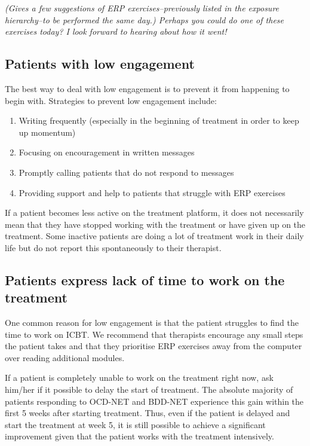 \documentclass[]{book}
\providecommand{\tightlist}{%
  \setlength{\itemsep}{0pt}\setlength{\parskip}{0pt}}
\theoremstyle{definition}
\theoremstyle{definition}
\theoremstyle{definition}
\theoremstyle{remark}
\begin{document}
\emph{(Gives a few suggestions of ERP exercises--previously listed in
the exposure hierarchy--to be performed the same day.) Perhaps you could
do one of these exercises today? I look forward to hearing about how it
went!}

\hypertarget{patients-with-low-engagement}{%
\subsection{Patients with low
engagement}\label{patients-with-low-engagement}}

The best way to deal with low engagement is to prevent it from happening
to begin with. Strategies to prevent low engagement include:

\begin{enumerate}
\def\labelenumi{\arabic{enumi}.}
\tightlist
\item
  Writing frequently (especially in the beginning of treatment in order
  to keep up momentum)
\item
  Focusing on encouragement in written messages
\item
  Promptly calling patients that do not respond to messages
\item
  Providing support and help to patients that struggle with ERP
  exercises
\end{enumerate}

If a patient becomes less active on the treatment platform, it does not
necessarily mean that they have stopped working with the treatment or
have given up on the treatment. Some inactive patients are doing a lot
of treatment work in their daily life but do not report this
spontaneously to their therapist.

\hypertarget{patients-express-lack-of-time-to-work-on-the-treatment}{%
\subsection{Patients express lack of time to work on the
treatment}\label{patients-express-lack-of-time-to-work-on-the-treatment}}

One common reason for low engagement is that the patient struggles to
find the time to work on ICBT. We recommend that therapists encourage
any small steps the patient takes and that they prioritise ERP exercises
away from the computer over reading additional modules.

If a patient is completely unable to work on the treatment right now,
ask him/her if it possible to delay the start of treatment. The absolute
majority of patients responding to OCD-NET and BDD-NET experience this
gain within the first 5 weeks after starting treatment. Thus, even if
the patient is delayed and start the treatment at week 5, it is still
possible to achieve a significant improvement given that the patient
works with the treatment intensively.
\end{document}
